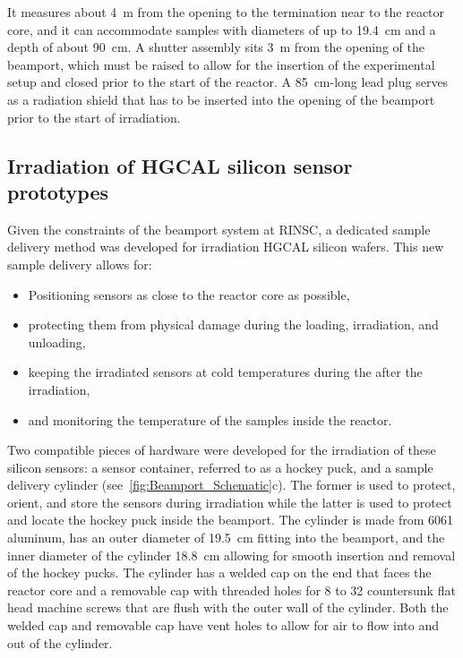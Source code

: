 It measures about \SI{4}{\metre} from the opening to the termination near to the reactor core, and it can accommodate samples with diameters of up to \SI{19.4}{\centi\metre} and a depth of about \SI{90}{\centi\metre}.
A shutter assembly sits \SI{3}{\metre} from the opening of the beamport, which must be raised to allow for the insertion of the experimental setup and closed prior to the start of the reactor.
A \SI{85}{\centi\metre}-long lead plug serves as a radiation shield that has to be inserted into the opening of the beamport prior to the start of irradiation.

\subsection{Irradiation of HGCAL silicon sensor prototypes}
\label{subsec:irradiation}
Given the constraints of the beamport system at RINSC, a dedicated sample delivery method was developed for irradiation HGCAL silicon wafers.
This new sample delivery allows for:
\begin{itemize}
  \item Positioning sensors as close to the reactor core as possible,
  \item protecting them from physical damage during the loading, irradiation, and unloading,
  \item keeping the irradiated sensors at cold temperatures during the after the irradiation,
  \item and monitoring the temperature of the samples inside the reactor.
\end{itemize}
Two compatible pieces of hardware were developed for the irradiation of these silicon sensors: a sensor container, referred to as a hockey puck, and a sample delivery cylinder (see~\ref{fig:Beamport_Schematic}c). 
The former is used to protect, orient, and store the sensors during irradiation while the latter is used to protect and locate the hockey puck inside the beamport.\newline
The cylinder is made from 6061 aluminum, has an outer diameter of \SI{19.5}{\centi\metre} fitting into the beamport, and the inner diameter of the cylinder \SI{18.8}{\centi\metre} allowing for smooth insertion and removal of the hockey pucks.
The cylinder has a welded cap on the end that faces the reactor core and a removable cap with threaded holes for 8 to 32 countersunk flat head machine screws that are flush with the outer wall of the cylinder. 
Both the welded cap and removable cap have vent holes to allow for air to flow into and out of the cylinder.
